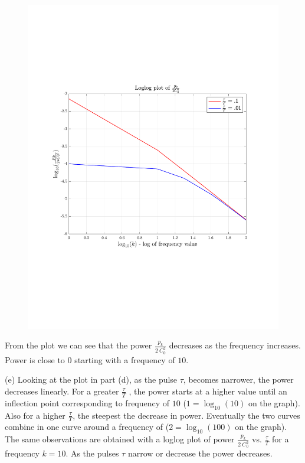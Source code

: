\documentclass[12pt,twoside]{article}
\begin{document}
\begin{figure}[!h]
 \centering
 \includegraphics[scale=0.5]{power_vs_tau_T}
\end{figure}
From the plot we can see that the power $\frac{p_k}{2 ~ C_0^2}$ decreases as the frequency increases.
Power is close to $0$ starting with a frequency of $10$.

\item [(e)]
Looking at the plot in part (d), as the pulse $\tau$, becomes narrower, the power decreases linearly.
For a greater  $\frac{\tau}{T}$ , the power starts at a higher value  until an inflection point corresponding to frequency of $10$ ($1 = \log_{10}(10)$ on the graph).
Also for a higher $\frac{\tau}{T}$, the steepest the decrease in power. Eventually the two curves combine in one curve around
a frequency of ($2 = \log_{10}(100)$ on the graph).
The same observations are obtained with a loglog plot  of power  $\frac{p_k}{2 ~ C_0^2}$ vs.  $\frac{\tau}{T}$ for a frequency $k=10$. As the
pulses $\tau$ narrow or decrease the power decreases.
\end{document}
